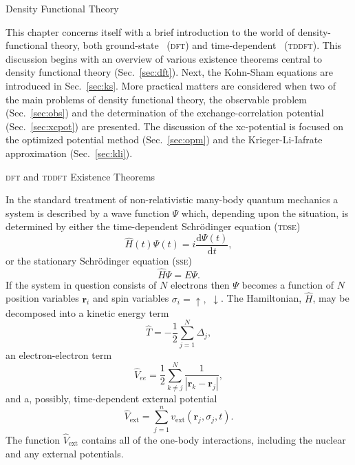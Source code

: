 \documentclass[a5paper, 9 pt]{extreport}
\begin{document}
\begin{chapter}{Density Functional Theory \label{chap:dft}}

   This chapter concerns itself with a brief introduction to the world of density-functional theory,
   both ground-state~\cite{dft-engel} (\textsc{dft}) and time-dependent~\cite{tddft, ullrich, marques-1}
   (\textsc{tddft}). This discussion begins with an overview  of various existence theorems central to
   density functional theory (Sec.~\ref{sec:dft}). Next, the Kohn-Sham equations are introduced in
   Sec.~\ref{sec:ks}. More practical matters are considered when two of the main problems of density
   functional theory, the observable problem (Sec.~\ref{sec:obs}) and the determination of the
   exchange-correlation potential (Sec.~\ref{sec:xcpot}) are presented. The discussion of the
   xc-potential is focused on the optimized potential method (Sec.~\ref{sec:opm}) and the
   Krieger-Li-Iafrate approximation (Sec.~\ref{sec:kli}).

   \begin{section}{\textsc{dft} and \textsc{tddft} Existence Theorems \label{sec:dft}}

      In the standard treatment of non-relativistic many-body quantum mechanics a system is described by
      a wave function $\Psi$ which, depending upon the situation, is determined by either the
      time-dependent Schr\"{o}dinger equation (\textsc{tdse})
      \begin{equation} \label{eq:tdse}
         \hat{H}(t) \Psi(t) = i \frac{\mathrm{d} \Psi(t)}{\mathrm{d} t},
      \end{equation}
      or the stationary Schr\"{o}dinger equation (\textsc{sse})
      \begin{equation} \label{eq:sse}
         \hat{H} \Psi = E \Psi.
      \end{equation}
      If the system in question consists of $N$ electrons then $\Psi$ becomes a function of $N$ position
      variables $\mathbf{r}_i$ and spin variables $\sigma_i = \uparrow,$ $\downarrow$. The Hamiltonian,
      $\hat{H}$, may be decomposed into a kinetic energy term
      \begin{equation} \label{eq:Top}
         \hat{T} = -\frac{1}{2} \sum\limits^{N}_{j=1} \Delta_j,
      \end{equation}
      an electron-electron term
      \begin{equation} \label{eq:Vee}
         \hat{V}_{ee} = \frac{1}{2} \sum\limits^{N}_{k \neq j}
                        \frac{1}{\left| \mathbf{r}_k - \mathbf{r}_j \right|},
      \end{equation}
      and a, possibly, time-dependent external potential
      \begin{equation} \label{eq:Vext}
         \hat{V}_\mathrm{ext} = \sum\limits^{n}_{j = 1} v_\mathrm{ext} (\mathbf{r}_j, \sigma_j, t).
      \end{equation}
      The function $\hat{V}_\mathrm{ext}$ contains all of the one-body interactions, including the
      nuclear and any external potentials.


\end{section}
\end{chapter}
\end{document}

